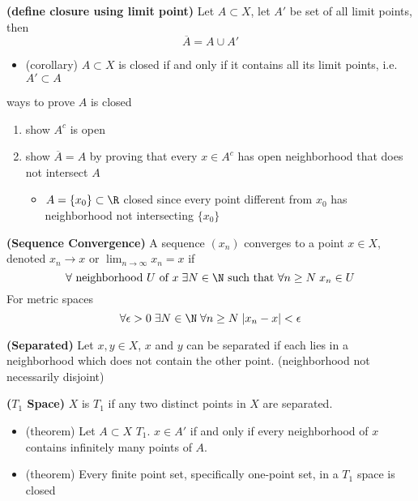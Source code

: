 \documentclass[10.5pt]{article}
\begin{document}
\begin{theorem*}
    \textbf{(define closure using limit point)} Let $A\subset X$, let $A'$ be set of all limit points, then
    \[
        \overline{A} = A\cup A'    
    \]
    \begin{itemize}
        \item (corollary) $A\subset X$ is closed if and only if it contains all its limit points, i.e. $A' \subset A$
    \end{itemize}
\end{theorem*}

\begin{rem}
    ways to prove $A$ is closed 
    \begin{enumerate}
        \item show $A^c$ is open
        \item show $\overline{A} = A$ by proving that every $x\in A^c$ has open neighborhood that does not intersect $A$
        \begin{itemize}
            \item $A=\{x_0\} \subset \R$ closed since every point different from $x_0$ has neighborhood not intersecting $\{x_0\}$
        \end{itemize}
    \end{enumerate}
\end{rem}

\begin{defn*}
    \textbf{(Sequence Convergence)} A sequence $(x_n)$ converges to a point $x\in X$, denoted $x_n \to x$ or $\lim_{n\to \infty} x_n = x$ if 
    \[
        \forall \text{ neighborhood } U \text{ of } x\; \exists N\in \N \text{ such that } \forall n\geq N \; x_n \in U
    \]
    For metric spaces
    \[
        \forall \epsilon > 0 \; \exists N\in \N \; \forall n\geq N \; |x_n - x| < \epsilon
    \]
\end{defn*}

\begin{defn*}
    \textbf{(Separated)} Let $x,y\in X$, $x$ and $y$ can be separated if each lies in a neighborhood which does not contain the other point. (neighborhood not necessarily disjoint)
\end{defn*}

\begin{defn*}
    \textbf{($T_1$ Space)} $X$ is $T_1$ if any two distinct points in $X$ are separated.
    \begin{itemize}
        \item (theorem) Let $A\subset X$ $T_1$. $x\in A'$ if and only if every neighborhood of $x$ contains infinitely many points of $A$.
        \item (theorem) Every finite point set, specifically one-point set, in a $T_1$ space is closed
    \end{itemize}
\end{defn*}
\end{document}
